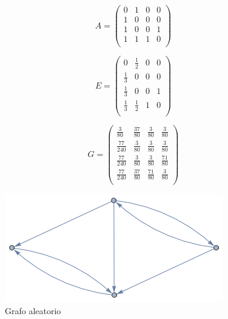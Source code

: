 \begin{equation}
    A =
    \begin{pmatrix}
        0 & 1 & 0 & 0 \\
        1 & 0 & 0 & 0 \\
        1 & 0 & 0 & 1 \\
        1 & 1 & 1 & 0 \\
    \end{pmatrix}
\end{equation}

\begin{equation}
    E =
    \begin{pmatrix}
        0 & \frac{1}{2} & 0 & 0 \\
        \frac{1}{3} & 0 & 0 & 0 \\
        \frac{1}{3} & 0 & 0 & 1 \\
        \frac{1}{3} & \frac{1}{2} & 1 & 0 \\
    \end{pmatrix}
\end{equation}

\begin{equation}
    G =
    \begin{pmatrix}
        \frac{3}{80} & \frac{37}{80} & \frac{3}{80} & \frac{3}{80} \\
        \frac{77}{240} & \frac{3}{80} & \frac{3}{80} & \frac{3}{80} \\
        \frac{77}{240} & \frac{3}{80} & \frac{3}{80} & \frac{71}{80} \\
        \frac{77}{240} & \frac{37}{80} & \frac{71}{80} & \frac{3}{80} \\
    \end{pmatrix}
\end{equation}

\begin{figure}[H]
    \centering
    \includegraphics[width=0.5\linewidth]{img/any.png}
    \caption[Grafo aleatorio]{Grafo aleatorio}
    \label{fig:any}
\end{figure}

